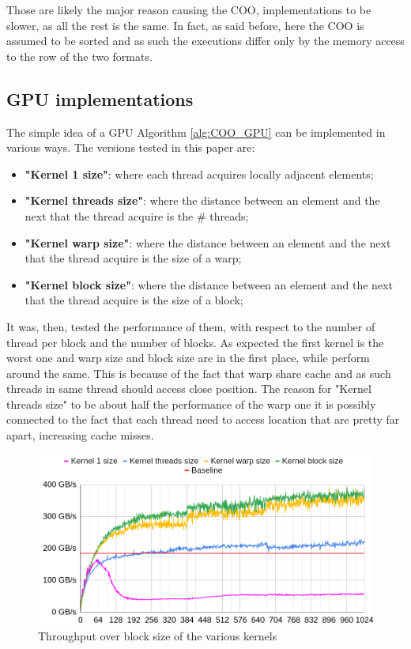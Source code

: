 \documentclass[conference]{IEEEtran}
\begin{document}
Those are likely the major reason causing the COO, implementations to be slower, as all the rest is the same. In fact, as said before, here the COO is assumed to be sorted and as such the executions differ only by the memory access to the row of the two formats.

\subsection{GPU implementations}
\label{subsec:GPU}
The simple idea of a GPU Algorithm \ref{alg:COO_GPU} can be implemented in various ways. The versions tested in this paper are:
\begin{itemize}
	\item \textbf{"Kernel 1 size"}: where each thread acquires locally adjacent elements;
	\item \textbf{"Kernel threads size"}: where the distance between an element and the next that the thread acquire is the \# threads;
	\item \textbf{"Kernel warp size"}: where the distance between an element and the next that the thread acquire is the size of a warp;
	\item \textbf{"Kernel block size"}: where the distance between an element and the next that the thread acquire is the size of a block;
\end{itemize}

It was, then, tested the performance of them, with respect to the number of thread per block and the number of blocks. As expected the first kernel is the worst one and warp size and block size are in the first place, while perform around the same. This is because of the fact that warp share cache and as such threads in same thread should access close position. The reason for "Kernel threads size" to be about half the performance of the warp one it is possibly connected to the fact that each thread need to access location that are pretty far apart, increasing cache misses.

\begin{figure}[h!]
	\centering
	\includegraphics[width=1\linewidth]{data_images/Gb_for_size_block_2}
	\caption{Throughput over block size of the various kernels}
	\label{fig:gbforsizeblock2}
\end{figure}
\end{document}
